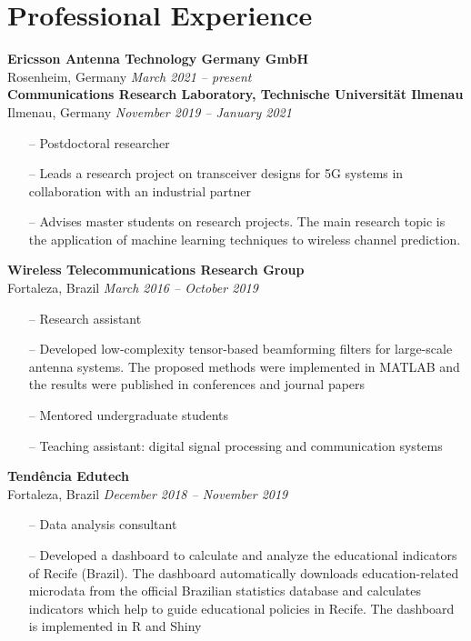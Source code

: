 \section{Professional Experience}

{\bf Ericsson Antenna Technology Germany GmbH}\\
Rosenheim, Germany \hfill {\it March 2021 -- present} \\

{\bf Communications Research Laboratory, Technische Universit\"at Ilmenau}\\
Ilmenau, Germany  \hfill {\it November 2019 -- January 2021} \\
\begin{itemize}
	\item[--] Postdoctoral researcher
	\item[--] Leads a research project on transceiver designs for 5G systems in collaboration with an industrial partner
	\item[--] Advises master students on research projects. The main research topic is the application of machine learning techniques to wireless channel prediction.
\end{itemize}

{\bf Wireless Telecommunications Research Group}\\
Fortaleza, Brazil \hfill {\it March 2016 -- October 2019}\\
\begin{itemize}
	\item[--] Research assistant
	\item[--] Developed low-complexity tensor-based beamforming filters for large-scale antenna systems. The proposed methods were implemented in MATLAB and the results were published in conferences and journal papers
	\item[--] Mentored undergraduate students
	\item[--] Teaching assistant: digital signal processing and communication systems
\end{itemize}

{\bf Tendência Edutech}\\
Fortaleza, Brazil \hfill {\it December 2018 -- November 2019}\\
\begin{itemize}
	\item[--] Data analysis consultant
	\item[--] Developed a dashboard to calculate and analyze the educational indicators of Recife (Brazil). The dashboard automatically downloads education-related microdata from the official Brazilian statistics database and calculates indicators which help to guide educational policies in Recife. The dashboard is implemented in R and Shiny
\end{itemize}

